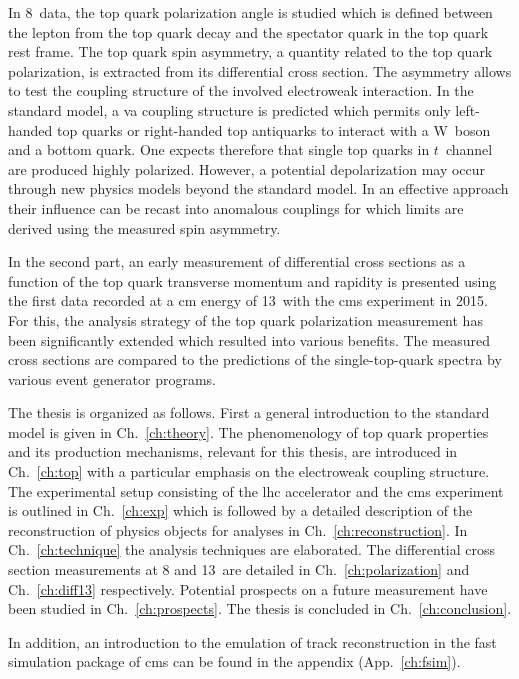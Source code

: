 In 8~\TeV data, the top quark polarization angle is studied which is defined between the lepton from the top quark decay and the spectator quark in the top quark rest frame. The top quark spin asymmetry, a quantity related to the top quark polarization, is extracted from its differential cross section. The asymmetry allows to test the coupling structure of the involved electroweak interaction. In the standard model, a \gls{va} coupling structure is predicted which permits only left-handed top quarks or right-handed top antiquarks to interact with a W~boson and a bottom quark. One expects therefore that single top quarks in $t$~channel are produced highly polarized. However, a potential depolarization may occur through new physics models beyond the standard model. In an effective approach their influence can be recast into anomalous couplings for which limits are derived using the measured spin asymmetry.

In the second part, an early measurement of differential cross sections as a function of the top quark transverse momentum and rapidity is presented using the first data recorded at a \acrlong{cm} energy of 13~\TeV with the \gls{cms} experiment in 2015. For this, the analysis strategy of the top quark polarization measurement has been significantly extended which resulted into various benefits. The measured cross sections are compared to the predictions of the single-top-quark spectra by various event generator programs.

The thesis is organized as follows. First a general introduction to the standard model is given in Ch.~\ref{ch:theory}. The phenomenology of top quark properties and its production mechanisms, relevant for this thesis, are introduced in Ch.~\ref{ch:top} with a particular emphasis on the electroweak coupling structure. The experimental setup consisting of the \gls{lhc} accelerator and the \gls{cms} experiment is outlined in Ch.~\ref{ch:exp} which is followed by a detailed description of the reconstruction of physics objects for analyses in Ch.~\ref{ch:reconstruction}. In Ch.~\ref{ch:technique} the analysis techniques are elaborated. The differential cross section measurements at 8 and 13~\TeV are detailed in Ch.~\ref{ch:polarization} and Ch.~\ref{ch:diff13} respectively. Potential prospects on a future measurement have been studied in Ch.~\ref{ch:prospects}. The thesis is concluded in Ch.~\ref{ch:conclusion}.

In addition, an introduction to the emulation of track reconstruction in the fast simulation package of \gls{cms} can be found in the appendix (App.~\ref{ch:fsim}).

